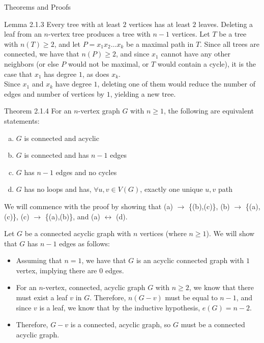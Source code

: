 \documentclass[10pt]{extarticle}
\begin{document}
\begin{problem}{Theorems and Proofs}
  \begin{problem}{Lemma 2.1.3}
    Every tree with at least $2$ vertices has at least $2$ leaves. Deleting a leaf from an $n$-vertex tree produces a tree with $n-1$ vertices.
    \tcblower
    Let $T$ be a tree with $n(T)\geq 2$, and let $P = x_1x_2\dots x_k$ be a maximal path in $T$. Since all trees are connected, we have that $n(P)\geq 2$, and since $x_1$ cannot have any other neighbors (or else $P$ would not be maximal, or $T$ would contain a cycle), it is the case that $x_1$ has degree $1$, as does $x_k$.\\

    Since $x_1$ and $x_k$ have degree $1$, deleting one of them would reduce the number of edges and number of vertices by $1$, yielding a new tree.
  \end{problem}
  \begin{problem}{Theorem 2.1.4}
    For an $n$-vertex graph $G$ with $n\geq 1$, the following are equivalent statements:
    \begin{enumerate}[(a)]
      \item $G$ is connected and acyclic
      \item $G$ is connected and has $n-1$ edges
      \item $G$ has $n-1$ edges and no cycles
      \item $G$ has no loops and has, $\forall u,v\in V(G)$, exactly one unique $u,v$ path
    \end{enumerate}
    \tcblower
    We will commence with the proof by showing that (a) $\rightarrow$ \{(b),(c)\}, (b) $\rightarrow$ \{(a),(c)\}, (c) $\rightarrow$ \{(a),(b)\}, and (a) $\leftrightarrow$ (d).
    \begin{description}[font=\normalfont]
      \item[(a) $\rightarrow$ \{(b),(c)\}:] Let $G$ be a connected acyclic graph with $n$ vertices (where $n\geq 1$). We will show that $G$ has $n-1$ edges as follows:
      \begin{itemize}
        \item Assuming that $n = 1$, we have that $G$ is an acyclic connected graph with $1$ vertex, implying there are $0$ edges.
        \item For an $n$-vertex, connected, acyclic graph $G$ with $n\geq 2$, we know that there must exist a leaf $v$ in $G$. Therefore, $n(G-v)$ must be equal to $n-1$, and since $v$ is a leaf, we know that by the inductive hypothesis, $e(G) = n-2$.
        \item Therefore, $G-v$ is a connected, acyclic graph, so $G$ must be a connected acyclic graph.
      \end{itemize}
      

\end{description}
\end{problem}
\end{problem}
\end{document}
